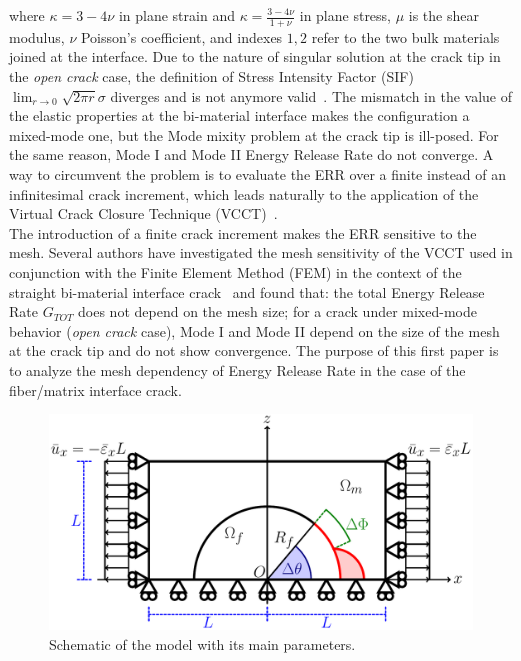 where $\kappa=3-4\nu$ in plane strain and $\kappa=\frac{3-4\nu}{1+\nu}$ in plane stress, $\mu$ is the shear modulus, $\nu$ Poisson's coefficient, and indexes $1,2$ refer to the two bulk materials joined at the interface. Due to the nature of singular solution at the crack tip in the \emph{open crack} case, the definition of Stress Intensity Factor (SIF) $\lim_{r\rightarrow 0}\sqrt{2\pi r}\sigma$ diverges and is not anymore valid~\cite{Comninou1990}. The mismatch in the value of the elastic properties at the bi-material interface makes the configuration a mixed-mode one, but the Mode mixity problem at the crack tip is ill-posed. For the same reason, Mode I and Mode II Energy Release Rate do not converge. A way to circumvent the problem is to evaluate the ERR over a finite instead of an infinitesimal crack increment, which leads naturally to the application of the Virtual Crack Closure Technique (VCCT)~\cite{Rybicki1977,Krueger2004}.\\
The introduction of a finite crack increment makes the ERR sensitive to the mesh. Several authors have investigated the mesh sensitivity of the VCCT used in conjunction with the Finite Element Method (FEM) in the context of the straight bi-material interface crack~\cite{Krueger2013,Sun1987,Sun1989,Manoharan1990,Raju1988,Agrawal2006,Wang2013} and found that: the total Energy Release Rate $G_{TOT}$ does not depend on the mesh size; for a crack under mixed-mode behavior (\emph{open crack} case), Mode I and Mode II depend on the size of the mesh at the crack tip and do not show convergence. The purpose of this first paper is to analyze the mesh dependency of Energy Release Rate in the case of the fiber/matrix interface crack.

\begin{figure}[!h]
\centering
\includegraphics[width=\textwidth]{paperA/RUC.pdf}
\caption{Schematic of the model with its main parameters.}\label{chap3:paperA:fig:modelschem}
\end{figure}

